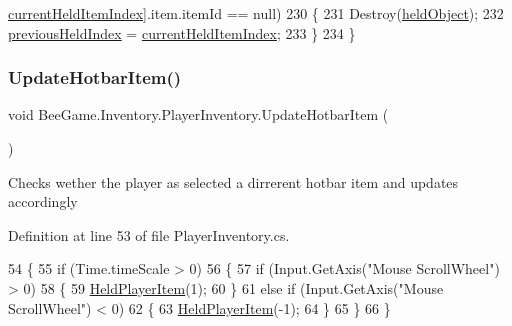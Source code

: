 \begin{DoxyCode}
      \hyperlink{class_bee_game_1_1_inventory_1_1_player_inventory_ac2978979c5c8e45fccc7d3a10882ea1b}{currentHeldItemIndex}].item.itemId == null)
230             \{
231                 Destroy(\hyperlink{class_bee_game_1_1_inventory_1_1_player_inventory_ae30e4d599863e910244ff52ba53a1dfb}{heldObject});
232                 \hyperlink{class_bee_game_1_1_inventory_1_1_player_inventory_a2e16150bcef69b49276c1617d4f2c030}{previousHeldIndex} = \hyperlink{class_bee_game_1_1_inventory_1_1_player_inventory_ac2978979c5c8e45fccc7d3a10882ea1b}{currentHeldItemIndex};
233             \}
234         \}
\end{DoxyCode}
\mbox{\label{class_bee_game_1_1_inventory_1_1_player_inventory_a1b86d5439ebb9f5dc6d9fefe3351cdc7}} 
\subsubsection{\texorpdfstring{Update\+Hotbar\+Item()}{UpdateHotbarItem()}}
{\footnotesize\ttfamily void Bee\+Game.\+Inventory.\+Player\+Inventory.\+Update\+Hotbar\+Item (\begin{DoxyParamCaption}{ }\end{DoxyParamCaption})\hspace{0.3cm}{\ttfamily [private]}}



Checks wether the player as selected a dirrerent hotbar item and updates accordingly 



Definition at line 53 of file Player\+Inventory.\+cs.


\begin{DoxyCode}
54         \{
55             \textcolor{keywordflow}{if} (Time.timeScale > 0)
56             \{
57                 \textcolor{keywordflow}{if} (Input.GetAxis(\textcolor{stringliteral}{"Mouse ScrollWheel"}) > 0)
58                 \{
59                     \hyperlink{class_bee_game_1_1_inventory_1_1_player_inventory_a370bc5a57950cdb31f834af4523a8436}{HeldPlayerItem}(1);
60                 \}
61                 \textcolor{keywordflow}{else} \textcolor{keywordflow}{if} (Input.GetAxis(\textcolor{stringliteral}{"Mouse ScrollWheel"}) < 0)
62                 \{
63                     \hyperlink{class_bee_game_1_1_inventory_1_1_player_inventory_a370bc5a57950cdb31f834af4523a8436}{HeldPlayerItem}(-1);
64                 \}
65             \}
66         \}
\end{DoxyCode}


